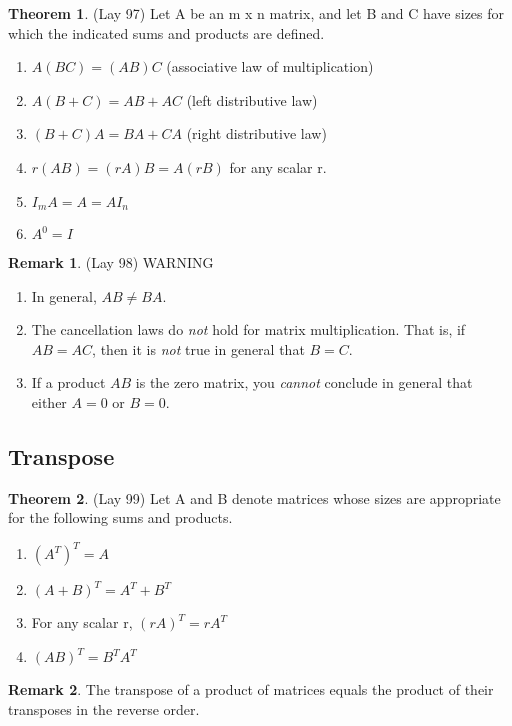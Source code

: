 \documentclass[12pt]{article}
\theoremstyle{definition}
\newtheorem{theorem}{Theorem}  %
\newtheorem*{remark}{Remark}        %
\numberwithin{equation}{theorem}    %
\begin{document}
\begin{theorem}(Lay 97)
    Let A be an m x n matrix, and let B and C have sizes for which the indicated sums and products are defined.

    \begin{enumerate}
        \item $A(BC)=(AB)C$ (associative law of multiplication)
        \item $A(B+C)=AB+AC$ (left distributive law)
        \item $(B+C)A = BA+CA$ (right distributive law)
        \item $r(AB) = (rA)B =A(rB)$ for any scalar r.
        \item $I_m A=A=AI_n$
        \item $A^0=I$
    \end{enumerate}
\end{theorem}

\begin{remark}(Lay 98)
    WARNING
    \begin{enumerate}
        \item In general, $AB \neq BA$.
        \item The cancellation laws do \emph{not} hold for matrix multiplication. That is, if $AB=AC$, then it is \emph{not} true in general that $B=C$.
        \item If a product $AB$ is the zero matrix, you \emph{cannot} conclude in general that either $A=0$ or $B=0$.
    \end{enumerate}
\end{remark}

\subsection{Transpose}

\begin{theorem}(Lay 99)
    Let A and B denote matrices whose sizes are appropriate for the following sums and products.
    \begin{enumerate}
        \item $(A^T)^T=A$
        \item $(A+B)^T=A^T+B^T$
        \item For any scalar r, $(rA)^T=rA^T$
        \item $(AB)^T=B^TA^T$
    \end{enumerate}
    \begin{remark}
        The transpose of a product of matrices equals the product of their transposes in the reverse order.
    \end{remark}
\end{theorem}
\end{document}
